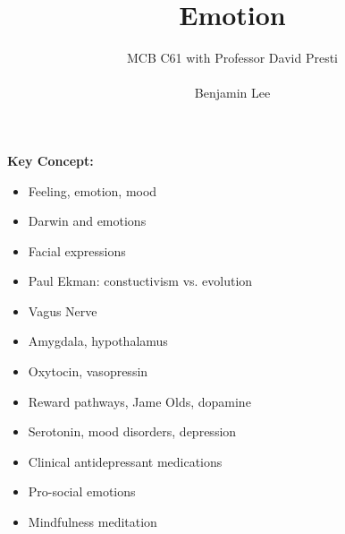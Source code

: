 \documentclass{article}
\title{Emotion}
\author{MCB C61 with Professor David Presti \\ \\ Benjamin Lee}
\begin{document}
\maketitle

\textbf{Key Concept:}
\begin{itemize}
    \item Feeling, emotion, mood
    \item Darwin and emotions
    \item Facial expressions
    \item Paul Ekman: constuctivism vs. evolution
    \item Vagus Nerve
    \item Amygdala, hypothalamus
    \item Oxytocin, vasopressin
    \item Reward pathways, Jame Olds, dopamine
    \item Serotonin, mood disorders, depression
    \item Clinical antidepressant medications
    \item Pro-social emotions
    \item Mindfulness meditation
\end{itemize}

\newpage
\end{document}
